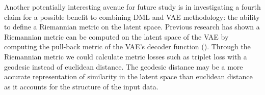 \documentclass[./dissertation.tex]{subfiles}
\begin{document}
    Another potentially interesting avenue for future study is in investigating a fourth claim for a possible benefit to combining DML and VAE methodology: the ability to define a Riemannian metric on the latent space. Previous research has shown a Riemannian metric can be computed on the latent space of the VAE by computing the pull-back metric of the VAE's decoder function (\cite{arvanitidis2020geometrically}). Through the Riemannian metric we could calculate metric losses such as triplet loss with a geodesic instead of euclidean distance. The geodesic distance may be a more accurate representation of similarity in the latent space than euclidean distance as it accounts for the structure of the input data. 
    
\end{document}
